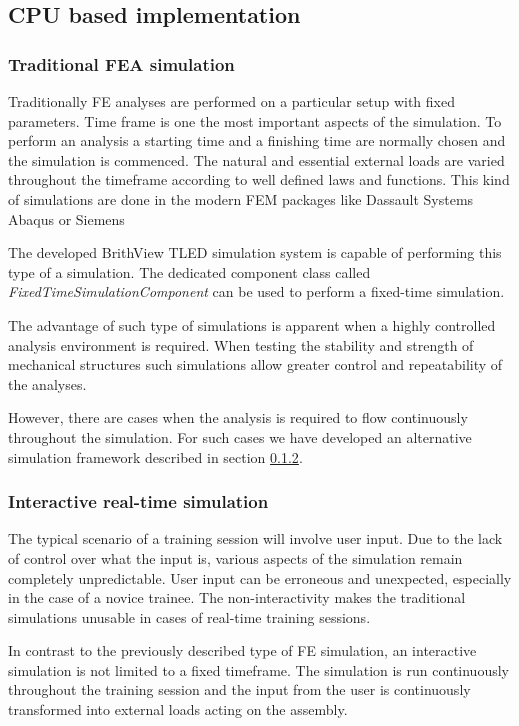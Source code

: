  \cite{Johnsen2014}

\subsection{CPU based implementation}

  \subsubsection{Traditional FEA simulation}

  Traditionally FE analyses are performed on a particular setup with fixed parameters. Time frame is one the most important aspects of the simulation. To perform an analysis a starting time and a finishing time are normally chosen and the simulation is commenced. The natural and essential external loads are varied throughout the timeframe according to well defined laws and functions. This kind of simulations are done in the modern FEM packages like Dassault Systems Abaqus or Siemens

  The developed BrithView TLED simulation system is capable of performing this type of a simulation. The dedicated component class called \textit{FixedTimeSimulationComponent} can be used to perform a fixed-time simulation.

  The advantage of such type of simulations is apparent when a highly controlled analysis environment is required. When testing the stability and strength of mechanical structures such simulations allow greater control and repeatability of the analyses.

  However, there are cases when the analysis is required to flow continuously throughout the simulation. For such cases we have developed an alternative simulation framework described in section \ref{methodology-fea-interactive}.

  \subsubsection{Interactive real-time simulation}\label{methodology-fea-interactive}

  The typical scenario of a training session will involve user input. Due to the lack of control over what the input is, various aspects of the simulation remain completely unpredictable. User input can be erroneous and unexpected, especially in the case of a novice trainee. The non-interactivity makes the traditional simulations unusable in cases of real-time training sessions.

  In contrast to the previously described type of FE simulation, an interactive simulation is not limited to a fixed timeframe. The simulation is run continuously throughout the training session and the  input from the user is continuously transformed into external loads acting on the assembly.
